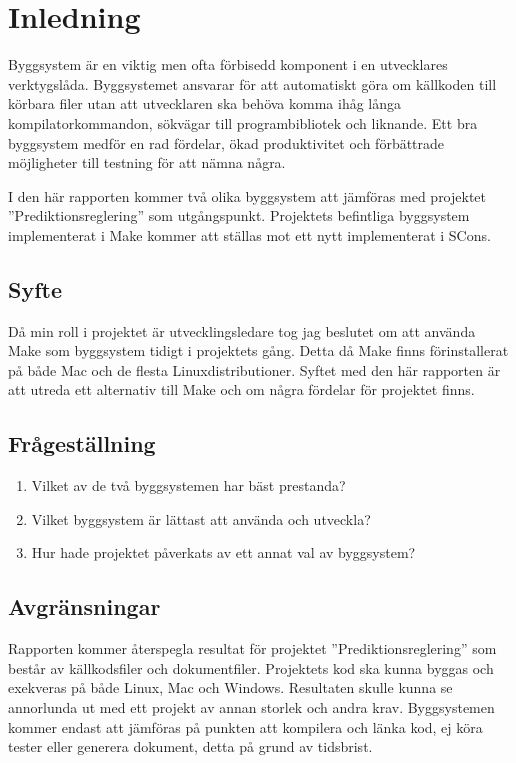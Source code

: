 \section{Inledning}
Byggsystem är en viktig men ofta förbisedd komponent i en utvecklares verktygslåda. Byggsystemet ansvarar för att automatiskt göra om källkoden till körbara filer utan att utvecklaren ska behöva komma ihåg långa kompilatorkommandon, sökvägar till programbibliotek och liknande. Ett bra byggsystem medför en rad fördelar, ökad produktivitet och förbättrade möjligheter till testning för att nämna några.

I den här rapporten kommer två olika byggsystem att jämföras med projektet ''Prediktionsreglering'' som utgångspunkt. Projektets befintliga byggsystem implementerat i Make kommer att ställas mot ett nytt implementerat i SCons. 

\subsection{Syfte}
Då min roll i projektet är utvecklingsledare tog jag beslutet om att använda Make som byggsystem tidigt i projektets gång. Detta då Make finns förinstallerat på både Mac och de flesta Linuxdistributioner. Syftet med den här rapporten är att utreda ett alternativ till Make och om några fördelar för projektet finns.

\subsection{Frågeställning}

\begin{enumerate}
\item Vilket av de två byggsystemen har bäst prestanda?
\item Vilket byggsystem är lättast att använda och utveckla?
\item Hur hade projektet påverkats av ett annat val av byggsystem?
\end{enumerate}

\subsection{Avgränsningar} \label{avsnitt:avgransningar}
Rapporten kommer återspegla resultat för projektet ''Prediktionsreglering'' som består av  källkodsfiler och  dokumentfiler. Projektets kod ska kunna byggas och exekveras på både Linux, Mac och Windows. Resultaten skulle kunna se annorlunda ut med ett projekt av annan storlek och andra krav. Byggsystemen kommer endast att jämföras på punkten att kompilera och länka kod, ej köra tester eller generera dokument, detta på grund av tidsbrist.
